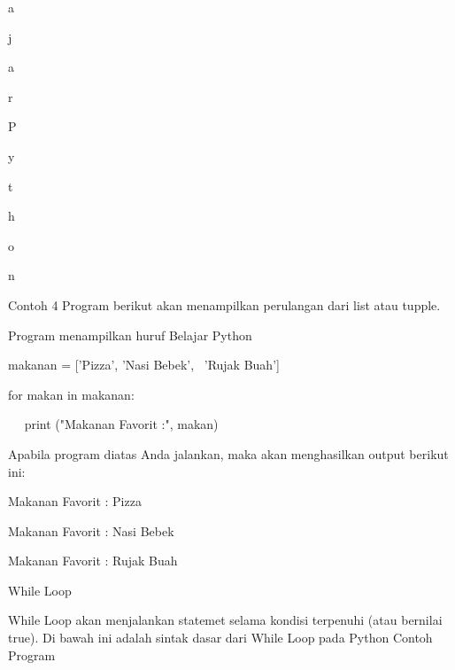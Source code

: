 a \par
j \par
a \par
r \par
  \par
P \par
y \par
t \par
h \par
o \par
n \par
\vspace{12pt}
Contoh 4\vspace{\baselineskip}
\vspace{\baselineskip}
Program berikut akan menampilkan perulangan dari list atau tupple.\vspace{\baselineskip}
\vspace{\baselineskip}
 \par
Program menampilkan huruf Belajar Python \par
\vspace{12pt}
makanan = ['Pizza', 'Nasi Bebek',~ 'Rujak Buah'] \par
for makan in makanan: \par
~~ print ("Makanan Favorit :", makan) \par
\vspace{12pt}
Apabila program diatas Anda jalankan, maka akan menghasilkan output berikut ini:\vspace{\baselineskip}
\vspace{\baselineskip}
 \par
Makanan Favorit : Pizza \par
Makanan Favorit : Nasi Bebek \par
Makanan Favorit : Rujak Buah \par
\vspace{12pt}
\vspace{\baselineskip}
\vspace{12pt}
While Loop \par
While Loop akan menjalankan statemet selama kondisi terpenuhi (atau bernilai true).\vspace{\baselineskip}
\vspace{\baselineskip}
Di bawah ini adalah sintak dasar dari While Loop pada Python\vspace{\baselineskip}
\vspace{\baselineskip}
Contoh Program\vspace{\baselineskip}
\vspace{\baselineskip}
